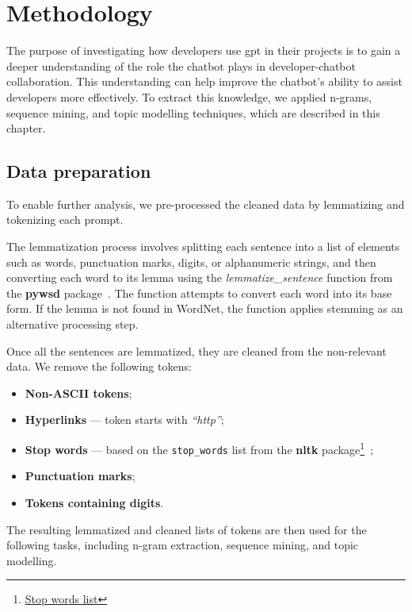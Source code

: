 \chapter{Methodology}\label{methodology}
The purpose of investigating how developers use \acrshort{gpt} in their projects is to gain a deeper understanding of the role the chatbot plays in developer-chatbot collaboration. This understanding can help improve the chatbot's ability to assist developers more effectively. To extract this knowledge, we applied n-grams, sequence mining, and topic modelling techniques, which are described in this chapter.

\section{Data preparation}\label{sec:data-prep}
To enable further analysis, we pre-processed the cleaned data by lemmatizing and tokenizing each prompt.  

The lemmatization process involves splitting each sentence into a list of elements such as words, punctuation marks, digits, or alphanumeric strings, and then converting each word to its lemma using the \textit{lemmatize\_sentence} function from the \textbf{pywsd} package~\cite{pywsd14}. The function attempts to convert each word into its base form. If the lemma is not found in WordNet, the function applies stemming as an alternative processing step.

Once all the sentences are lemmatized, they are cleaned from the non-relevant data. We remove the following tokens: 
\begin{itemize}
    \item \textbf{Non-ASCII tokens};
    \item \textbf{Hyperlinks} --- token starts with \textit{``http''};
    \item \textbf{Stop words} --- based on the \texttt{stop\_words} list from the \textbf{nltk} package\footnote{\href{https://www.geeksforgeeks.org/removing-stop-words-nltk-python/}{Stop words list}}~\cite{nltk};
    \item \textbf{Punctuation marks}; 
    \item \textbf{Tokens containing digits}.
\end{itemize}

The resulting lemmatized and cleaned lists of tokens are then used for the following tasks, including n-gram extraction, sequence mining, and topic modelling.

